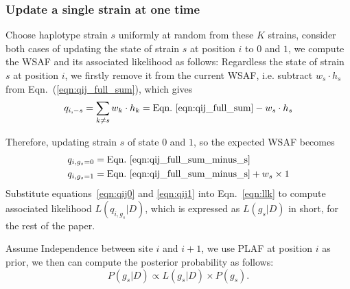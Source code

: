 \documentclass{bioinfo}
\begin{document}
\subsubsection{Update a single strain at one time}

Choose haplotype strain $s$ uniformly at random from these $K$ strains, consider both cases of updating the state of strain $s$ at position $i$ to $0$ and $1$, we compute the WSAF and its associated likelihood as follows: Regardless the state of strain $s$ at position $i$, we firstly remove it from the current WSAF, i.e. subtract $ w_s \cdot h_s$ from Eqn.~(\ref{eqn:qij_full_sum}), which gives
\begin{equation}
q_{i,-s} = \sum_{k\neq s} w_k \cdot h_k = \textrm{Eqn.~\eqref{eqn:qij_full_sum}} -  w_s \cdot h_s \label{eqn:qij_full_sum_minus_s}
\end{equation}

Therefore, updating strain $s$ of state $0$ and $1$, so the expected WSAF becomes
\begin{align}
q_{i,g_s=0} & = \textrm{Eqn.~\eqref{eqn:qij_full_sum_minus_s}} \label{eqn:qij0}\\
q_{i,g_s=1} & = \textrm{Eqn.~\eqref{eqn:qij_full_sum_minus_s}} + w_s \times 1 \label{eqn:qij1}
\end{align}
Substitute equations~\eqref{eqn:qij0} and \eqref{eqn:qij1} into Eqn.~\eqref{eqn:llk} to compute associated likelihood $L(q_{i,g_s} |D)$, which is expressed as $L(g_s |D)$ in short, for the rest of the paper.


Assume Independence between site $i$ and $i+1$, we use PLAF at position $i$ as prior, we then can compute the posterior probability as follows:
\begin{equation}
P(g_s | D) \propto L(g_s|D) \times P(g_s).\label{eqn:post:LDfree}
\end{equation}

\end{document}
